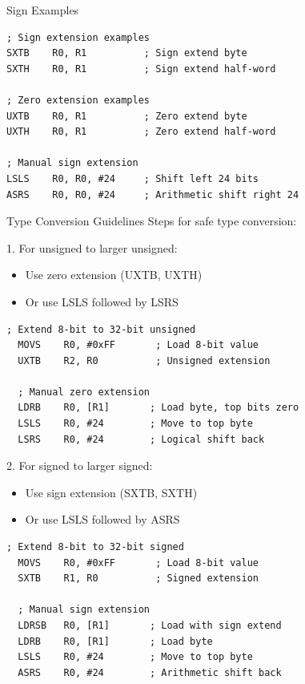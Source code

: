 \begin{example2}{Sign Examples}
\begin{lstlisting}[language=armasm, style=basesmol]
; Sign extension examples
SXTB    R0, R1          ; Sign extend byte
SXTH    R0, R1          ; Sign extend half-word

; Zero extension examples
UXTB    R0, R1          ; Zero extend byte
UXTH    R0, R1          ; Zero extend half-word

; Manual sign extension
LSLS    R0, R0, #24     ; Shift left 24 bits
ASRS    R0, R0, #24     ; Arithmetic shift right 24
\end{lstlisting}
\end{example2}

\begin{KR}{Type Conversion Guidelines}
Steps for safe type conversion:

1. For unsigned to larger unsigned:
\begin{itemize}
  \item Use zero extension (UXTB, UXTH)
  \item Or use LSLS followed by LSRS
\end{itemize}

\begin{lstlisting}[language=armasm, style=basesmol]
  ; Extend 8-bit to 32-bit unsigned
  MOVS    R0, #0xFF       ; Load 8-bit value
  UXTB    R2, R0          ; Unsigned extension
  
  ; Manual zero extension
  LDRB    R0, [R1]       ; Load byte, top bits zero
  LSLS    R0, #24        ; Move to top byte
  LSRS    R0, #24        ; Logical shift back
\end{lstlisting}

2. For signed to larger signed:
\begin{itemize}
  \item Use sign extension (SXTB, SXTH)
  \item Or use LSLS followed by ASRS
\end{itemize}

\begin{lstlisting}[language=armasm, style=basesmol]
  ; Extend 8-bit to 32-bit signed
  MOVS    R0, #0xFF       ; Load 8-bit value
  SXTB    R1, R0          ; Signed extension
  
  ; Manual sign extension
  LDRSB   R0, [R1]       ; Load with sign extend
  LDRB    R0, [R1]       ; Load byte
  LSLS    R0, #24        ; Move to top byte
  ASRS    R0, #24        ; Arithmetic shift back
\end{lstlisting}



\end{KR}
